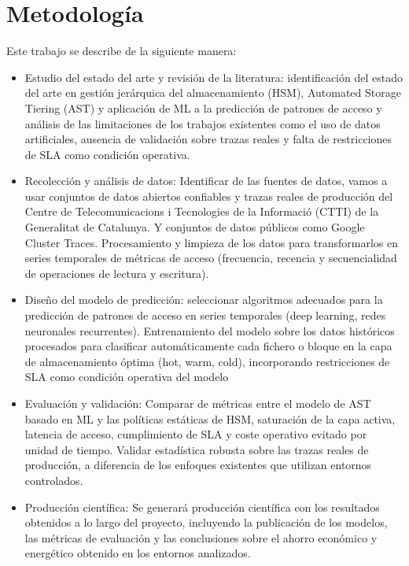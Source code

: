 \section{Metodología}
Este trabajo se describe de la siguiente manera:
\begin{itemize}
  \item Estudio del estado del arte y revisión de la literatura: identificación del estado del arte en gestión jerárquica del almacenamiento (HSM), Automated Storage Tiering (AST) y aplicación de ML a la predicción de patrones de acceso y análisis de las limitaciones de los trabajos existentes como el uso de datos artificiales, ausencia de validación sobre trazas reales y falta de restricciones de SLA como condición operativa.
  \item Recolección y análisis de datos: Identificar de las fuentes de datos, vamos a usar conjuntos de datos abiertos confiables y trazas reales de producción del Centre de Telecomunicacions i Tecnologies de la Informació (CTTI) de la Generalitat de Catalunya. Y conjuntos de datos públicos como Google Cluster Traces. Procesamiento y limpieza de los datos para transformarlos en series temporales de métricas de acceso (frecuencia, recencia y secuencialidad de operaciones de lectura y escritura).
  \item Diseño del modelo de predicción: seleccionar algoritmos adecuados para la predicción de patrones de acceso en series temporales (deep learning, redes neuronales recurrentes). Entrenamiento del modelo sobre los datos históricos procesados para clasificar automáticamente cada fichero o bloque en la capa de almacenamiento óptima (hot, warm, cold), incorporando restricciones de SLA como condición operativa del modelo
  \item Evaluación y validación: Comparar de métricas entre el modelo de AST basado en ML y las políticas estáticas de HSM, saturación de la capa activa, latencia de acceso, cumplimiento de SLA y coste operativo evitado por unidad de tiempo. Validar estadística robusta sobre las trazas reales de producción, a diferencia de los enfoques existentes que utilizan entornos controlados.
  \item Producción científica: Se generará producción científica con los resultados obtenidos a lo largo del proyecto, incluyendo la publicación de los modelos, las métricas de evaluación y las conclusiones sobre el ahorro económico y energético obtenido en los entornos analizados.
\end{itemize}
